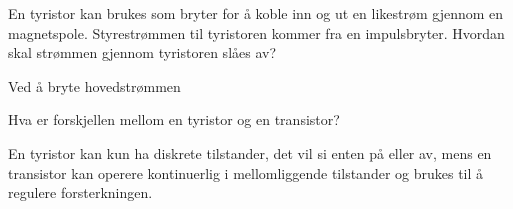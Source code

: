 \begin{question}[name=Spørsmål, topic=tyristor]
	En tyristor kan brukes som bryter for å koble inn og ut en likestrøm gjennom en magnetspole. Styrestrømmen til tyristoren kommer fra en impulsbryter. Hvordan skal strømmen gjennom tyristoren slåes av?
\end{question}

\vspace{0.5cm} %

\begin{solution}[name=Løsningsforslag]
	Ved å bryte hovedstrømmen
\end{solution}

\vspace{0.5cm} %

\begin{question}[name=Spørsmål, topic=tyristor]
Hva er forskjellen mellom en tyristor og en transistor?
\end{question}

\vspace{0.5cm} %

\begin{solution}[name=Løsningsforslag]
En tyristor kan kun ha diskrete tilstander, det vil si enten på eller av, mens en transistor kan operere kontinuerlig i mellomliggende tilstander og brukes til å regulere forsterkningen.
\end{solution}


